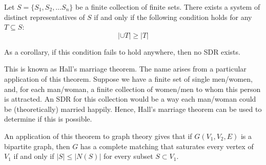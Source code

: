 \documentclass[12pt]{article}
\begin{document}
Let $S = \{ S_1,S_2,\dots S_n \}$ be a finite collection of finite sets.  There exists a system of distinct representatives of $S$ if and only if the following condition holds for any $T \subseteq S$:
$$\left | \cup T \right | \geq |T|$$

As a corollary, if this condition fails to hold anywhere, then no SDR exists.

This is known as Hall's marriage theorem.  The name arises from a particular application of this theorem.  Suppose we have a finite set of single men/women, and, for each man/woman, a finite collection of women/men to whom this person is attracted.  An SDR for this collection would be a way each man/woman could be (theoretically) married happily.  Hence, Hall's marriage theorem can be used to determine if this is possible.

An application of this theorem to graph theory gives that if $G(V_1, V_2, E)$ is a bipartite graph, then $G$ has a complete matching that saturates every vertex of $V_1$ if and only if $|S|\leq |N(S)|$ for every subset $S\subset V_1$.
\end{document}
